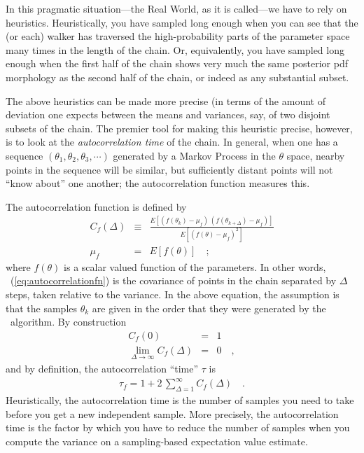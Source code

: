 \documentclass[12pt,twoside,pdftex]{article}
\newcommand{\MCMC}{\acronym{MCMC}}
\newcommand{\pars}{\theta}
\begin{document}
In this pragmatic situation---the Real World, as it is called---we have to rely on heuristics.
Heuristically, you have sampled long enough when you can see
that the (or each) walker has traversed the high-probability parts of
the parameter space many times in the length of the chain.
Or, equivalently, you have sampled long enough when the first half of
the chain shows very much the same posterior pdf morphology as the
second half of the chain, or indeed as any substantial subset.

The above heuristics can be made more precise (in terms of the amount
of deviation one expects between the means and variances, say, of two
disjoint subsets of the chain.
The premier tool for making this heuristic precise, however, is to
look at the \emph{autocorrelation time} of the chain.
In general, when one has a sequence $(\pars_1, \pars_2, \theta_3, \cdots)$
generated by a Markov Process in the $\pars$ space, nearby points in
the sequence will be similar, but sufficiently distant points will not
``know about'' one another;
the autocorrelation function measures this.

The autocorrelation function is defined by
\begin{eqnarray}
C_f(\Delta) &\equiv& \frac{E[(f(\pars_k)-\mu_f)\,(f(\pars_{k+\Delta})-\mu_f)]}
                          {E[(f(\pars)-\mu_f)^2]}
\label{eq:autocorrelationfn}\\
\mu_f &=& E[f(\pars)]
\quad ;
\end{eqnarray}
where $f(\pars)$ is a scalar valued function of the parameters.
In other words, \equationname~(\ref{eq:autocorrelationfn}) is the covariance
of points in the chain separated by $\Delta$ steps, taken relative to the
variance.
In the above equation, the assumption is that the samples $\pars_k$ are
given in the order that they were generated by the \MCMC\ algorithm.
By construction
\begin{eqnarray}
C_f(0) &=& 1
\\
\lim_{\Delta\rightarrow\infty} C_f(\Delta) &=& 0
\quad ,
\end{eqnarray}
and by definition, the autocorrelation ``time'' $\tau$ is
\begin{eqnarray}
\tau_f = 1 + 2\,\sum_{\Delta = 1}^{\infty} C_f(\Delta)
\label{eq:autocorrelationtime}\quad.
\end{eqnarray}
Heuristically, the autocorrelation time is the number of samples you
need to take before you get a new independent sample.
More precisely, the autocorrelation time is the factor by which you
have to reduce the number of samples when you compute the variance on
a sampling-based expectation value estimate.
\end{document}
